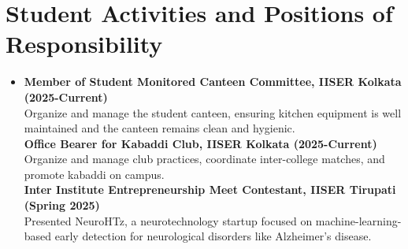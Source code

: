 \documentclass[a4paper,11pt]{article}
\begin{document}
%
\section{\textbf{Student Activities and Positions of Responsibility}}
\begin{itemize}[leftmargin=0.05in, label={}]
    \item{
    \textbf{Member of Student Monitored Canteen Committee, IISER Kolkata (2025-Current)}} \\
    Organize and manage the student canteen, ensuring kitchen equipment is well maintained and the canteen remains clean and hygienic. \\
    \textbf{Office Bearer for Kabaddi Club, IISER Kolkata (2025-Current)} \\
    Organize and manage club practices, coordinate inter-college matches, and promote kabaddi on campus. \\
    \textbf{Inter Institute Entrepreneurship Meet Contestant, IISER Tirupati (Spring 2025)} \\
    Presented NeuroHTz, a neurotechnology startup focused on machine-learning-based early detection for neurological disorders like Alzheimer's disease.
\end{itemize}




\vspace{-5mm}
\setlength{\footskip}{4.08003pt}







\end{document}
